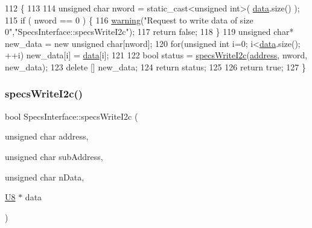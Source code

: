 \begin{DoxyCode}
112                                                       \{
113 
114   \textcolor{keywordtype}{unsigned} \textcolor{keywordtype}{char} nword = \textcolor{keyword}{static\_cast<}\textcolor{keywordtype}{unsigned} \textcolor{keywordtype}{int}\textcolor{keyword}{>}( \hyperlink{namespaceshell_a5ea2525995cedc3efd69ea8a7f034d1e}{data}.size() );
115   \textcolor{keywordflow}{if} ( nword == 0 ) \{
116     \hyperlink{classObject_a65cd4fda577711660821fd2cd5a3b4c9}{warning}(\textcolor{stringliteral}{"Request to write data of size 0"},\textcolor{stringliteral}{"SpecsInterface::specsWriteI2c"});
117     \textcolor{keywordflow}{return} \textcolor{keyword}{false};
118   \}
119   \textcolor{keywordtype}{unsigned} \textcolor{keywordtype}{char}* new\_data = \textcolor{keyword}{new} \textcolor{keywordtype}{unsigned} \textcolor{keywordtype}{char}[nword];
120   \textcolor{keywordflow}{for}(\textcolor{keywordtype}{unsigned} \textcolor{keywordtype}{int} i=0; i<\hyperlink{namespaceshell_a5ea2525995cedc3efd69ea8a7f034d1e}{data}.size(); ++i) new\_data[i] = \hyperlink{namespaceshell_a5ea2525995cedc3efd69ea8a7f034d1e}{data}[i];
121  
122   \textcolor{keywordtype}{bool} status =     \hyperlink{classSpecsInterface_a20dacf68396a40eadbb740db73ff9624}{specsWriteI2c}(\hyperlink{classSpecsInterface_a0fa039a15b842a5ba783ce825b9915d8}{address}, nword, new\_data);
123   \textcolor{keyword}{delete} [] new\_data;
124   \textcolor{keywordflow}{return} status;
125 
126   \textcolor{keywordflow}{return} \textcolor{keyword}{true};
127 \}
\end{DoxyCode}
\mbox{\label{classSpecsInterface_a08dff9a17cd6073cd94fbd2cf7340dbd}} 
\subsubsection{\texorpdfstring{specs\+Write\+I2c()}{specsWriteI2c()}\hspace{0.1cm}{\footnotesize\ttfamily [3/4]}}
{\footnotesize\ttfamily bool Specs\+Interface\+::specs\+Write\+I2c (\begin{DoxyParamCaption}\item[{unsigned char}]{address,  }\item[{unsigned char}]{sub\+Address,  }\item[{unsigned char}]{n\+Data,  }\item[{\hyperlink{ICECALv3_8h_a3cb25ca6f51f003950f9625ff05536fc}{U8} $\ast$}]{data }\end{DoxyParamCaption})\hspace{0.3cm}{\ttfamily [inherited]}}

